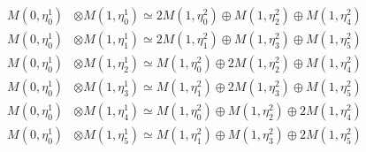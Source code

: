 \begin{align*}
M(0,\eta^{1}_{0}) &\otimes M(1,\eta^{1}_{0}) \simeq 2 M(1,\eta^{2}_{0}) \oplus M(1,\eta^{2}_{2}) \oplus M(1,\eta^{2}_{4}) \\
M(0,\eta^{1}_{0}) &\otimes M(1,\eta^{1}_{1}) \simeq 2 M(1,\eta^{2}_{1}) \oplus M(1,\eta^{2}_{3}) \oplus M(1,\eta^{2}_{5}) \\
M(0,\eta^{1}_{0}) &\otimes M(1,\eta^{1}_{2}) \simeq M(1,\eta^{2}_{0}) \oplus 2 M(1,\eta^{2}_{2}) \oplus M(1,\eta^{2}_{4}) \\
M(0,\eta^{1}_{0}) &\otimes M(1,\eta^{1}_{3}) \simeq M(1,\eta^{2}_{1}) \oplus 2 M(1,\eta^{2}_{3}) \oplus M(1,\eta^{2}_{5}) \\
M(0,\eta^{1}_{0}) &\otimes M(1,\eta^{1}_{4}) \simeq M(1,\eta^{2}_{0}) \oplus M(1,\eta^{2}_{2}) \oplus 2 M(1,\eta^{2}_{4}) \\
M(0,\eta^{1}_{0}) &\otimes M(1,\eta^{1}_{5}) \simeq M(1,\eta^{2}_{1}) \oplus M(1,\eta^{2}_{3}) \oplus 2 M(1,\eta^{2}_{5}) \\
\end{align*}

